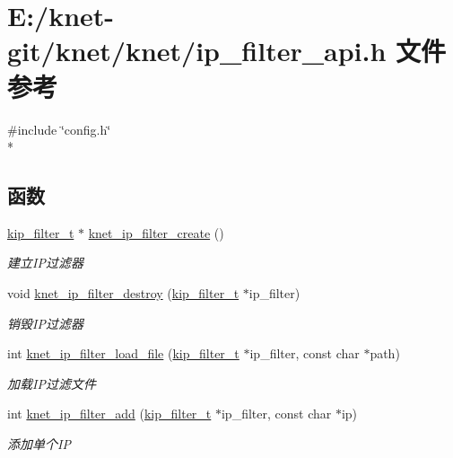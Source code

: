 \hypertarget{a00068}{}\section{E\+:/knet-\/git/knet/knet/ip\+\_\+filter\+\_\+api.h 文件参考}
\label{a00068}
{\ttfamily \#include \char`\"{}config.\+h\char`\"{}}\\*
\subsection*{函数}
\begin{DoxyCompactItemize}
\item 
\hyperlink{a00054_a1c0c604eecd86fc8895cf4bbbba566af_a1c0c604eecd86fc8895cf4bbbba566af}{kip\+\_\+filter\+\_\+t} $\ast$ \hyperlink{a00112_ga14e6d1c3709870a082f203c8ba0ca9f4_ga14e6d1c3709870a082f203c8ba0ca9f4}{knet\+\_\+ip\+\_\+filter\+\_\+create} ()
\begin{DoxyCompactList}\small\item\em 建立\+I\+P过滤器 \end{DoxyCompactList}\item 
void \hyperlink{a00112_gae2d8c7b5356b36261f90f59bc49181e1_gae2d8c7b5356b36261f90f59bc49181e1}{knet\+\_\+ip\+\_\+filter\+\_\+destroy} (\hyperlink{a00054_a1c0c604eecd86fc8895cf4bbbba566af_a1c0c604eecd86fc8895cf4bbbba566af}{kip\+\_\+filter\+\_\+t} $\ast$ip\+\_\+filter)
\begin{DoxyCompactList}\small\item\em 销毁\+I\+P过滤器 \end{DoxyCompactList}\item 
int \hyperlink{a00112_ga044a4fc59ee0910af3c2d030e025c536_ga044a4fc59ee0910af3c2d030e025c536}{knet\+\_\+ip\+\_\+filter\+\_\+load\+\_\+file} (\hyperlink{a00054_a1c0c604eecd86fc8895cf4bbbba566af_a1c0c604eecd86fc8895cf4bbbba566af}{kip\+\_\+filter\+\_\+t} $\ast$ip\+\_\+filter, const char $\ast$path)
\begin{DoxyCompactList}\small\item\em 加载\+I\+P过滤文件 \end{DoxyCompactList}\item 
int \hyperlink{a00112_ga271a51fad46aa61d322b6c9da2d5ba1e_ga271a51fad46aa61d322b6c9da2d5ba1e}{knet\+\_\+ip\+\_\+filter\+\_\+add} (\hyperlink{a00054_a1c0c604eecd86fc8895cf4bbbba566af_a1c0c604eecd86fc8895cf4bbbba566af}{kip\+\_\+filter\+\_\+t} $\ast$ip\+\_\+filter, const char $\ast$ip)
\begin{DoxyCompactList}\small\item\em 添加单个\+I\+P \end{DoxyCompactList}\item 

\end{DoxyCompactItemize}
